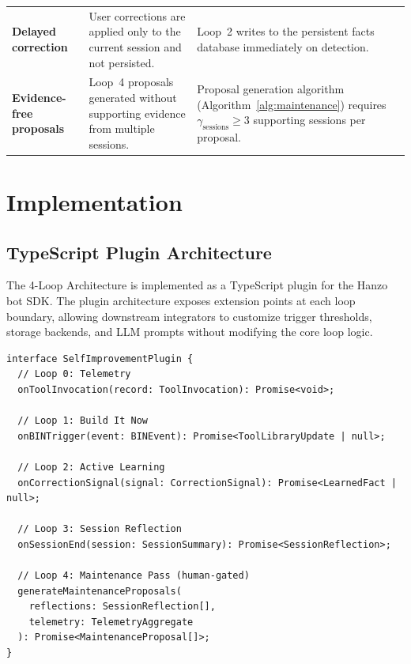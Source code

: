 \documentclass[11pt]{article}
\begin{document}
\begin{table}[H]
\begin{tabularx}{\textwidth}{lXX}
\textbf{Delayed correction} &
User corrections are applied only to the current session and not persisted. &
Loop~2 writes to the persistent facts database immediately on detection. \\[6pt]

\textbf{Evidence-free proposals} &
Loop~4 proposals generated without supporting evidence from multiple sessions. &
Proposal generation algorithm (Algorithm~\ref{alg:maintenance}) requires
$\gamma_{\text{sessions}} \geq 3$ supporting sessions per proposal. \\
\bottomrule
\end{tabularx}
\end{table}

\section{Implementation}
\label{sec:implementation}

\subsection{TypeScript Plugin Architecture}

The 4-Loop Architecture is implemented as a TypeScript plugin for the Hanzo
bot SDK. The plugin architecture exposes extension points at each loop
boundary, allowing downstream integrators to customize trigger thresholds,
storage backends, and LLM prompts without modifying the core loop logic.

\begin{verbatim}
interface SelfImprovementPlugin {
  // Loop 0: Telemetry
  onToolInvocation(record: ToolInvocation): Promise<void>;

  // Loop 1: Build It Now
  onBINTrigger(event: BINEvent): Promise<ToolLibraryUpdate | null>;

  // Loop 2: Active Learning
  onCorrectionSignal(signal: CorrectionSignal): Promise<LearnedFact | null>;

  // Loop 3: Session Reflection
  onSessionEnd(session: SessionSummary): Promise<SessionReflection>;

  // Loop 4: Maintenance Pass (human-gated)
  generateMaintenanceProposals(
    reflections: SessionReflection[],
    telemetry: TelemetryAggregate
  ): Promise<MaintenanceProposal[]>;
}
\end{verbatim}
\end{document}
